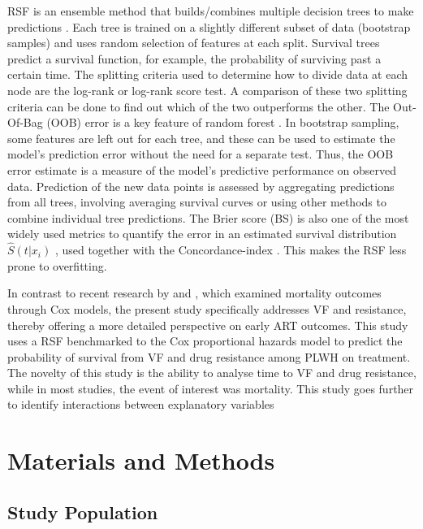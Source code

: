 \documentclass[10pt]{NSP1}
\begin{document}
RSF is an ensemble method that builds/combines multiple decision trees to make predictions \cite{Breiman2003}. Each tree is trained on a slightly different subset of data (bootstrap samples) and uses random selection of features at each split. Survival trees predict a survival function, for example, the probability of surviving past a certain time. The splitting criteria used to determine how to divide data at each node are the log-rank or log-rank score test. A comparison of these two splitting criteria can be done to find out which of the two outperforms the other. The Out-Of-Bag (OOB) error is a key feature of random forest \cite{Ishwaran2008}. In bootstrap sampling, some features are left out for each tree, and these can be used to estimate the model’s prediction error without the need for a separate test. Thus, the OOB error estimate is a measure of the model’s predictive performance on observed data. Prediction of the new data points is assessed by aggregating predictions from all trees, involving averaging survival curves or using other methods to combine individual tree predictions. The Brier score (BS) is also one of the most widely used metrics to quantify the error in an estimated survival distribution $\hat{S} (t|x_i)$ \cite{Berkowitz2023}, used together with the Concordance-index \cite{Ishwaran2008}. This makes the RSF less prone to overfitting. 

In contrast to recent research by \cite{Naghibifar2024} and \cite{Afrashteh2023}, which examined mortality outcomes through Cox models, the present study specifically addresses VF and resistance, thereby offering a more detailed perspective on early ART outcomes. This study uses a RSF benchmarked to the Cox proportional hazards model to predict the probability of survival from VF and drug resistance among PLWH on treatment. The novelty of this study is the ability to analyse time to VF and drug resistance, while in most studies, the event of interest was mortality. This study goes further to identify interactions between explanatory variables



\section{Materials and Methods}
\subsection{Study Population}
\end{document}
